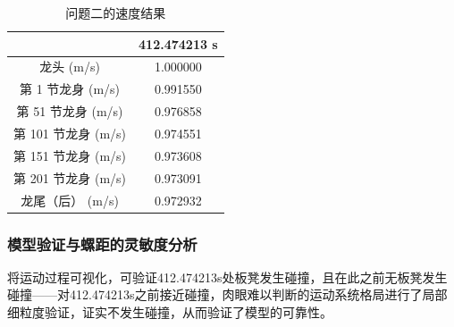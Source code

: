 \documentclass[a4paper]{article}
\begin{document}
        \begin{table}[H] %
        	\captionsetup{skip=4pt} %
        	\caption{问题二的速度结果}
        	\centering
        	\setlength{\arrayrulewidth}{0.5pt} %
        	\begin{tabular}{|c|c|} %
        		\hline
        		                   &  412.474213 s \\ \hline
        		龙头 (m/s)         &  1.000000 \\ \hline
        		第 1 节龙身 (m/s)   & 0.991550 \\ \hline
        		第 51 节龙身 (m/s)  & 0.976858 \\ \hline
        		第 101 节龙身 (m/s) & 0.974551 \\ \hline
        		第 151 节龙身 (m/s) & 0.973608 \\ \hline
        		第 201 节龙身 (m/s) & 0.973091 \\ \hline
        		龙尾（后） (m/s)    & 0.972932 \\ \hline
        	\end{tabular}
        \end{table}
        
        \subsubsection{模型验证与螺距的灵敏度分析}
        将运动过程可视化，可验证412.474213s处板凳发生碰撞，且在此之前无板凳发生碰撞——对412.474213s之前接近碰撞，肉眼难以判断的运动系统格局进行了局部细粒度验证，证实不发生碰撞，从而验证了模型的可靠性。
\end{document}
